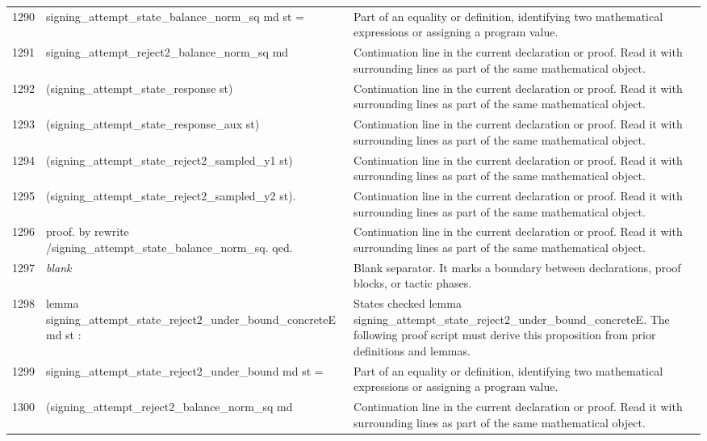\documentclass[10pt]{article}
\begin{document}
\begin{longtable}{r L{0.53\textwidth} L{0.37\textwidth}}
1290 & {\ttfamily\scriptsize   signing\_attempt\_state\_balance\_norm\_sq md st =} & Part of an equality or definition, identifying two mathematical expressions or assigning a program value. \\
1291 & {\ttfamily\scriptsize   signing\_attempt\_reject2\_balance\_norm\_sq md} & Continuation line in the current declaration or proof.  Read it with surrounding lines as part of the same mathematical object. \\
1292 & {\ttfamily\scriptsize     (signing\_attempt\_state\_response st)} & Continuation line in the current declaration or proof.  Read it with surrounding lines as part of the same mathematical object. \\
1293 & {\ttfamily\scriptsize     (signing\_attempt\_state\_response\_aux st)} & Continuation line in the current declaration or proof.  Read it with surrounding lines as part of the same mathematical object. \\
1294 & {\ttfamily\scriptsize     (signing\_attempt\_state\_reject2\_sampled\_y1 st)} & Continuation line in the current declaration or proof.  Read it with surrounding lines as part of the same mathematical object. \\
1295 & {\ttfamily\scriptsize     (signing\_attempt\_state\_reject2\_sampled\_y2 st).} & Continuation line in the current declaration or proof.  Read it with surrounding lines as part of the same mathematical object. \\
1296 & {\ttfamily\scriptsize proof. by rewrite /signing\_attempt\_state\_balance\_norm\_sq. qed.} & Continuation line in the current declaration or proof.  Read it with surrounding lines as part of the same mathematical object. \\
1297 & {\ttfamily\scriptsize \emph{blank}} & Blank separator.  It marks a boundary between declarations, proof blocks, or tactic phases. \\
1298 & {\ttfamily\scriptsize lemma signing\_attempt\_state\_reject2\_under\_bound\_concreteE md st :} & States checked lemma signing\_attempt\_state\_reject2\_under\_bound\_concreteE.  The following proof script must derive this proposition from prior definitions and lemmas. \\
1299 & {\ttfamily\scriptsize   signing\_attempt\_state\_reject2\_under\_bound md st =} & Part of an equality or definition, identifying two mathematical expressions or assigning a program value. \\
1300 & {\ttfamily\scriptsize   (signing\_attempt\_reject2\_balance\_norm\_sq md} & Continuation line in the current declaration or proof.  Read it with surrounding lines as part of the same mathematical object. \\

\end{longtable}
\end{document}
